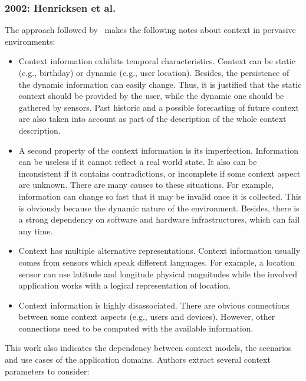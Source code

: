 \subsubsection{2002: Henricksen et al.}
\label{sec:henricksen}

The approach followed by~\citet{henricksen_modeling_2002} makes the following
notes about context in pervasive environments:

\begin{itemize}
  \item Context information exhibits temporal characteristics. Context can be 
  static (e.g., birthday) or dynamic (e.g., user location). Besides, the 
  persistence of the dynamic information can easily change. Thus, it is justified 
  that the static context should be provided by the user, while the dynamic 
  one should be gathered by sensors. Past historic and a possible forecasting 
  of future context are also taken into account as part of the description of 
  the whole context description.
  
  \item A second property of the context information is its imperfection. 
  Information can be useless if it cannot reflect a real world state. It also 
  can be inconsistent if it contains contradictions, or incomplete if some 
  context aspect are unknown. There are many causes to these situations. For 
  example, information can change so fast that it may be invalid once it is 
  collected. This is obviously because the dynamic nature of the environment. 
  Besides, there is a strong dependency on software and hardware infrastructures, 
  which can fail any time.
  
  \item Context has multiple alternative representations. Context information
  usually comes from sensors which speak different languages. For example,
  a location sensor can use latitude and longitude physical magnitudes while 
  the involved application works with a logical representation of location. 
  
  \item Context information is highly disassociated. There are obvious 
  connections between some context aspects (e.g., users and devices). However, 
  other connections need to be computed with the available information.
\end{itemize}

This work also indicates the dependency between context models, the scenarios 
and use cases of the application domains. Authors extract several context 
parameters to consider:

